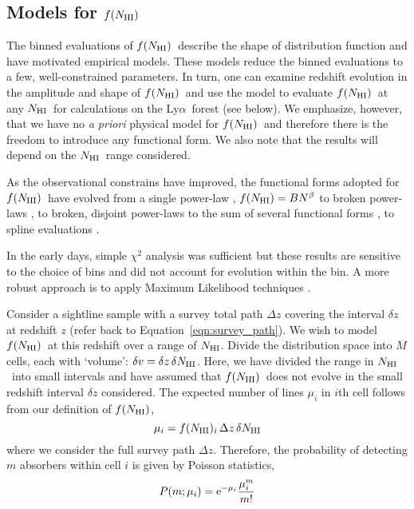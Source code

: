 \documentclass[graybox]{svmult}
\def\lya{Ly$\alpha$}
\newcommand{\mnhi}{N_{\rm HI}}
\newcommand{\nhi}{$\mnhi$}
\def\mfnhi{f(\mnhi)}
\def\fnhi{$\mfnhi$}
\begin{document}
\subsection{Models for \fnhi}

The binned evaluations of \fnhi\ describe the shape of 
distribution function and have motivated empirical
models. These models reduce the binned evaluations to a few, 
well-constrained parameters.  In turn, one can
examine redshift evolution in the amplitude and shape
of \fnhi\ and use the model to evaluate \fnhi\ at 
any \nhi\ for calculations on the \lya\ forest (see below).
We emphasize, however, that we have no {\it a priori}
physical model for \fnhi\ and therefore there is the
freedom to introduce any functional form.
We also note that the results will depend
on the \nhi\ range considered. 

As the observational constrains have improved, the
functional forms adopted for \fnhi\ have evolved from
a single power-law \cite{tytler87},
$\mfnhi = B N^\beta$
to broken power-laws \cite{petitjean93,pro+10},
to broken, disjoint power-laws \cite{rudie13} 
to the sum of several functional forms \cite{inoue14},
to spline evaluations \cite{pro+14}.

In the early days, simple $\chi^2$ analysis
was sufficient but these results
are sensitive to the choice of bins and did
not account for evolution within the bin.
A more robust approach is to apply Maximum
Likelihood techniques \cite{storrie96;cooksey2010}.

Consider a sightline sample with a survey total path $\Delta z$ 
covering the interval $\delta z$ at redshift $z$ (refer
back to Equation~\ref{eqn:survey_path}).
We wish to model \fnhi\ at this redshift over a
range of \nhi.  
Divide the distribution space into $M$ cells, each with 
`volume': $\delta v = \delta z \, \delta \mnhi$.
Here, we have divided the range in \nhi\ into small intervals
and have assumed that \fnhi\ does not evolve in the small
redshift interval $\delta z$ considered.
The expected number of lines $\mu_i$ in $i$th cell
follows from our definition of \fnhi, 
\begin{equation}
\mu_i = f(\mnhi)_i \, \Delta z \, \delta\mnhi
\end{equation}
where we consider the full survey path $\Delta z$.
Therefore, the probability of detecting $m$ absorbers within 
cell $i$ is given by Poisson statistics,
\begin{equation}
P(m; \mu_i) = {\rm e}^{-\mu_i} \frac{\mu_i^m}{m!}
\end{equation}
\end{document}
